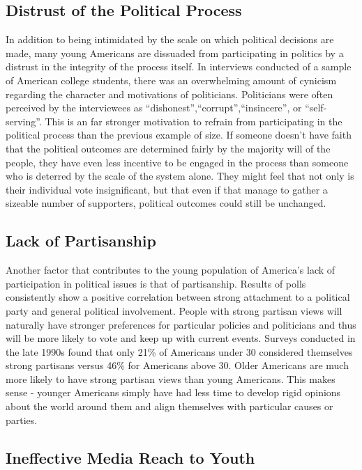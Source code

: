 \documentclass[12pt,letterpaper]{article}
\begin{document}
\subsection{Distrust of the Political Process} In addition to being
intimidated by the scale on which political decisions are made, many
young Americans are dissuaded from participating in politics by a
distrust in the integrity of the process itself. In interviews
conducted of a sample of American college students, there was an
overwhelming amount of cynicism regarding the character and
motivations of politicians.  Politicians were often perceived by the
interviewees as ``dishonest'',``corrupt'',``insincere'', or
``self-serving''.  This is an far stronger motivation to refrain from
participating in the political process than the previous example of
size. If someone doesn't have faith that the political outcomes are
determined fairly by the majority will of the people, they have even
less incentive to be engaged in the process than someone who is
deterred by the scale of the system alone.  They might feel that not
only is their individual vote insignificant, but that even if that
manage to gather a sizeable number of supporters, political outcomes
could still be unchanged.

\subsection{Lack of Partisanship} Another factor that contributes to
the young population of America's lack of participation in political
issues is that of partisanship.  Results of polls consistently show a
positive correlation between strong attachment to a political party
and general political involvement.  People with strong partisan views
will naturally have stronger preferences for particular policies and
politicians and thus will be more likely to vote and keep up with
current events. Surveys conducted in the late 1990s found that only
21\% of Americans under 30 considered themselves strong partisans
versus 46\% for Americans above 30. Older Americans are much more
likely to have strong partisan views than young Americans.  This makes
sense - younger Americans simply have had less time to develop rigid
opinions about the world around them and align themselves with
particular causes or parties.  

\subsection{Ineffective Media Reach to Youth}
\end{document}
